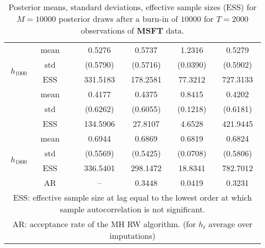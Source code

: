 {\begin{table}
\begin{tabular}{ccc cc cc}
\multirow{4}{*}{$h_{1000}$}   & mean &   & 0.5276  & 0.5737  & 1.2316  & 0.5279  \\ [0.75ex]
 & std &   & (0.5790)  & (0.5716)  & (0.0390)  & (0.5902)  \\ [0.75ex]
 & ESS  &   & 331.5183  & 178.2581  & 77.3212  & 727.3133  \\ [1.3ex] 
\multirow{4}{*}{$h_{1400}$}   & mean &   & 0.4177  & 0.4375  & 0.8415  & 0.4202  \\ [0.75ex]
 & std &   & (0.6262)  & (0.6055)  & (0.1218)  & (0.6181)  \\ [0.75ex]
 & ESS  &   & 134.5906  & 27.8107  & 4.6528  & 421.9445  \\ [1.3ex] 
\multirow{4}{*}{$h_{1800}$}   & mean &   & 0.6944  & 0.6869  & 0.6819  & 0.6824  \\ [0.75ex]
 & std &   & (0.5569)  & (0.5425)  & (0.0708)  & (0.5806)  \\ [0.75ex]
 & ESS  &   & 336.5401  & 298.1472  & 18.8341  & 782.7012  \\ [1.3ex] 
 & AR & & --  & 0.3448  & 0.0419  & 0.3231 \\ \hline 
\hline 
\multicolumn{7}{p{11cm}}{\footnotesize{ESS: effective sample size at lag equal to the lowest order at which sample autocorrelation is not significant.}}  \\ 
\multicolumn{7}{p{11cm}}{\footnotesize{AR: acceptance rate of the MH RW algorithm. (for $h_{t}$ average over imputations)}}  \\ 
\end{tabular}
 \caption{Posterior means, standard deviations, effective sample sizes (ESS)  for $M=10000$ posterior draws after a burn-in of $10000$ for $T=2000$ observations of \textbf{MSFT} data.}
\label{tab:SV_results_MSFT}  
\end{table}
}
